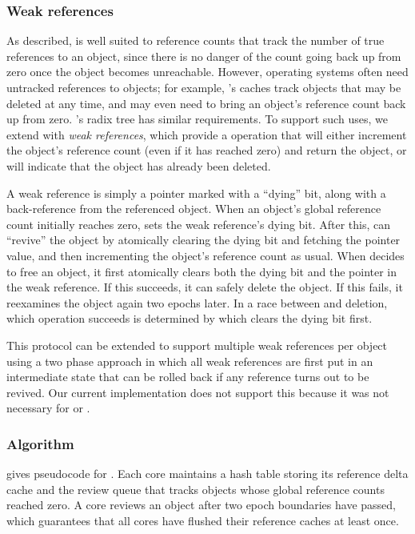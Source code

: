 \subsubsection{Weak references}
As described,  is well suited to reference counts that track
the number of true references to an object, since there is no danger
of the count going back up from zero once the object becomes unreachable.
However, operating systems often need untracked references to objects;
for example, \fs's caches track objects that may be deleted at any time,
and may even need to bring an object's reference count back up from
zero.  \vm's radix tree has similar requirements.  To support such
uses, we extend  with \emph{weak references}, which provide a
 operation that will either increment the object's
reference count (even if it has reached zero) and return the object,
or will indicate that the object has already been deleted.

A weak reference is simply a pointer marked with a ``dying'' bit,
along with a back-reference from the referenced object.  When an
object's global reference count initially reaches zero,  sets
the weak reference's dying bit.  After this,  can
``revive'' the object by atomically clearing the dying bit and
fetching the pointer value, and then incrementing the object's
reference count as usual.  When  decides to free an object,
it first atomically clears both the dying bit and the pointer in the
weak reference.  If this succeeds, it can safely delete the object.
If this fails, it reexamines the object again two epochs later.  In a
race between  and deletion, which operation succeeds is determined
by which clears the dying bit first.

This protocol can be extended to support multiple weak references per
object using a two phase approach in which all weak references are
first put in an intermediate state that can be rolled back if any
reference turns out to be revived.  Our current implementation does
not support this because it was not necessary for \vm or \fs.

\subsubsection{Algorithm}
 gives pseudocode for .  Each core
maintains a hash table
storing its reference delta cache and the review queue that tracks
objects whose global reference counts reached zero.  A core reviews an
object after two epoch boundaries have passed, which guarantees
that all cores have flushed their
reference caches at least once.

